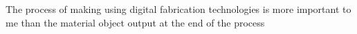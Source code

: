The process of making using digital fabrication technologies is more important to me than the material object output at the end of the process